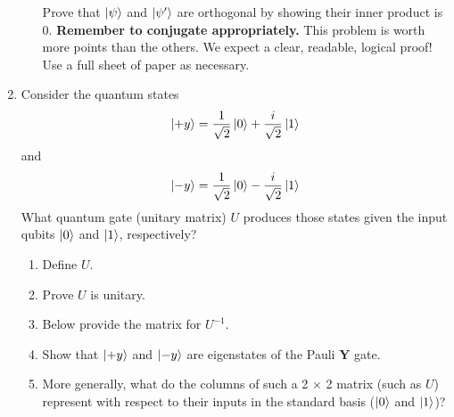 \documentclass[12pt]{article}
\def\DefaultSpace{1in}
\newcommand{\LeaveSpace}[1][\DefaultSpace]{%
\vskip #1 plus 1fil\relax\hbox to 0pt{\hss} %
}
\begin{document}
\begin{enumerate}[font=\bfseries]
\begin{enumerate}[label=\theenumi.\arabic*]
        Prove that $\ket{\psi}$ and $\ket{\psi'}$ are orthogonal by showing their inner product is 0. \textbf{Remember to conjugate appropriately.} This problem is worth more points than the others. 
 We expect a clear, readable, logical proof! Use a full sheet of paper as necessary. 
    \end{enumerate}
    \newpage
    \item {} Consider the quantum states
        \[\ket{+y} = \frac{1}{\sqrt{2}}\ket{0} + \frac{i}{\sqrt{2}}\ket{1}\]
        and
        \[\ket{-y} = \frac{1}{\sqrt{2}}\ket{0} - \frac{i}{\sqrt{2}}\ket{1}\]
        What quantum gate (unitary matrix) $U$ produces those states given the input qubits $\ket{0}$ and $\ket{1}$, respectively?
        \begin{enumerate}[label=\theenumi.\arabic*]
            \item {} Define $U$. 
            \Ans{\[
            U = \SQBG{\RootTwo}{1}{1}{\NiceI}{-\NiceI}
            \]}
            \item {} Prove $U$ is unitary. \Ans{
            \[\SQBG{\RootTwo}{1}{1}{\NiceI}{-\NiceI} \times \SQBG{\RootTwo}{1}{-\NiceI}{1}{\NiceI} = \Identity{} \]
            }
            \item {} Below provide the matrix for $U^{-1}$. 
            \item {} Show that $\ket{+y}$ and $\ket{-y}$ are eigenstates of the Pauli $\mathbf{Y}$ gate. \Ans{\[
            \YMatrix{} \RootTwo{}\SQB{1}{\NiceI} =+1 \SQB{1}{\NiceI} \]\[
            \YMatrix{} \RootTwo{}\SQB{1}{-\NiceI} =-1 \SQB{1}{-\NiceI}
            \]}
            \item {} More generally, what do the columns of such a 2 × 2 matrix (such as $U$) represent with respect to their inputs in the standard basis ($\ket{0}$ and $\ket{1}$)? 
        \end{enumerate}

\end{enumerate}
\end{document}
